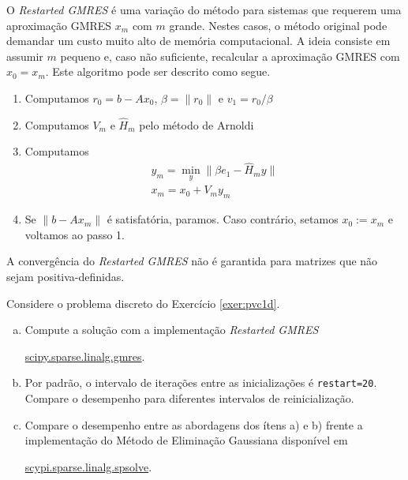\begin{obs}
  O {\it Restarted GMRES} é uma variação do método para sistemas que requerem uma aproximação GMRES $x_m$ com $m$ grande. Nestes casos, o método original pode demandar um custo muito alto de memória computacional. A ideia consiste em assumir $m$ pequeno e, caso não suficiente, recalcular a aproximação GMRES com $x_0 = x_m$. Este algoritmo pode ser descrito como segue.
  \begin{enumerate}[1.]
  \item Computamos $r_0 = b - Ax_0$, $\beta = \|r_0\|$ e $v_1 = r_0/\beta$
  \item Computamos $V_m$ e $\hat{H}_m$ pelo método de Arnoldi
  \item Computamos
    \begin{gather}
      y_m = \min_y \|\beta e_1 - \hat{H}_my\|\\
      x_m = x_0 + V_my_m
    \end{gather}
  \item Se $\|b-Ax_m\|$ é satisfatória, paramos. Caso contrário, setamos $x_0 := x_m$ e voltamos ao passo 1.
  \end{enumerate}

  A convergência do {\it Restarted GMRES} não é garantida para matrizes que não sejam positiva-definidas.
\end{obs}

\begin{exer}\label{exer:pvc1d_gmres}
  Considere o problema discreto do Exercício \ref{exer:pvc1d}.
  \begin{enumerate}[a)]
  \item Compute a solução com a implementação {\it Restarted GMRES}
    \begin{center}
    \href{https://docs.scipy.org/doc/scipy/reference/generated/scipy.sparse.linalg.gmres.html}{scipy.sparse.linalg.gmres}.
  \end{center}
  \item Por padrão, o intervalo de iterações entre as inicializações é \lstinline+restart=20+. Compare o desempenho para diferentes intervalos de reinicialização.
  \item Compare o desempenho entre as abordagens dos ítens a) e b) frente a implementação do Método de Eliminação Gaussiana disponível em
    \begin{center}
    \href{https://docs.scipy.org/doc/scipy/reference/generated/scipy.sparse.linalg.spsolve.html#scipy.sparse.linalg.spsolve}{scypi.sparse.linalg.spsolve}.
  \end{center}

  \end{enumerate}
\end{exer}

